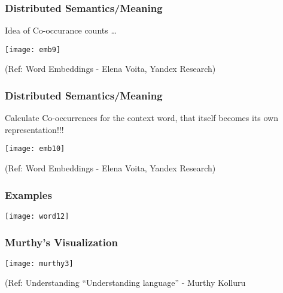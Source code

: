 \begin{frame}[fragile]\frametitle{Distributed Semantics/Meaning}
Idea of Co-occurance counts \ldots

\begin{center}
\texttt{[image: emb9]}
\end{center}

{\tiny (Ref: Word Embeddings - Elena Voita, Yandex Research)}
\end{frame}

\begin{frame}[fragile]\frametitle{Distributed Semantics/Meaning}
Calculate Co-occurrences for the context word, that itself becomes its own representation!!!

\begin{center}
\texttt{[image: emb10]}
\end{center}

{\tiny (Ref: Word Embeddings - Elena Voita, Yandex Research)}
\end{frame}



\begin{frame}[fragile]\frametitle{Examples}
\begin{center}
\texttt{[image: word12]}
\end{center}
\end{frame}

\begin{frame}[fragile]\frametitle{Murthy's Visualization}

\begin{center}
\texttt{[image: murthy3]}

{\tiny (Ref: Understanding ``Understanding language'' - Murthy Kolluru}

\end{center}

\end{frame}


